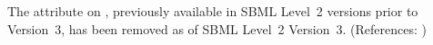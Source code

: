 The  attribute on \Event, previously available in SBML
Level~2 versions prior to Version~3, has been removed as of SBML Level~2
Version~3.  (References: )
